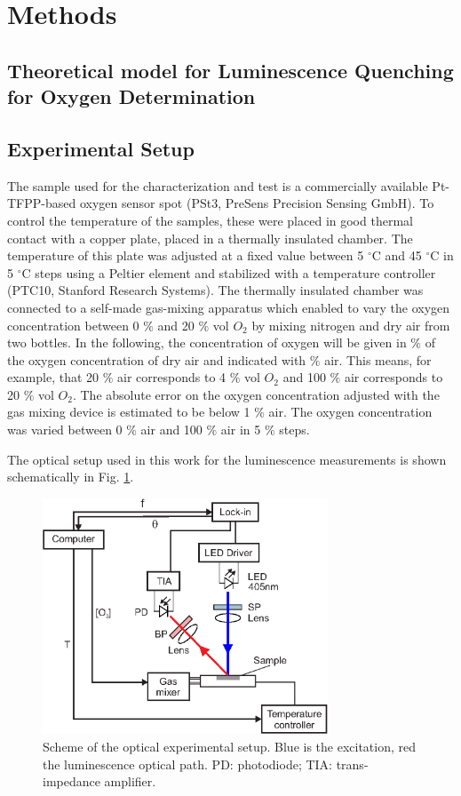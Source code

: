 \documentclass[9pt,twocolumn,twoside,pdftex]{optica}
\begin{document}
\section{Methods}
\label{sec:methods}

\subsection{Theoretical model for Luminescence Quenching for Oxygen Determination}
\label{Theory}




\subsection{Experimental Setup}
\label{Experimental}

The sample used for the characterization and test is a commercially available Pt-TFPP-based oxygen sensor spot (PSt3, PreSens Precision Sensing GmbH).
To control the temperature of the samples, these were placed in good thermal contact with a copper plate, placed in a thermally insulated chamber. The temperature of this plate was adjusted at a fixed value between 5 $^\circ$C and 45 $^\circ$C in 5 $^\circ$C steps using a Peltier element and stabilized with a temperature controller (PTC10, Stanford Research Systems). The thermally insulated chamber was connected to a self-made gas-mixing apparatus which enabled to vary the oxygen concentration between 0 $\%$ and 20 $\%$ vol $O_2$ by mixing nitrogen and dry air from two bottles. In the following, the concentration of oxygen will be given in $\%$ of the oxygen concentration of dry air and indicated with $\%$ air. This means, for example, that 20 $\%$ air corresponds to 4 $\%$ vol $O_2$ and 100 $\%$ air corresponds to 20 $\%$ vol $O_2$. The absolute error on the oxygen concentration adjusted with the gas mixing device is estimated to be below 1 $\%$ air. The oxygen concentration was varied between 0 $\%$ air and 100 $\%$ air in 5 $\%$ steps.
 
The optical setup used in this work for the luminescence measurements is shown schematically in Fig. \ref{fig:setup}.

\begin{figure}[htbp]
\centering
\includegraphics[keepaspectratio, width=8.5cm]{setup_auto.eps}
\caption{Scheme of the optical experimental setup. Blue is the excitation, red the luminescence optical path. PD: photodiode; TIA: trans-impedance amplifier.}
\label{fig:setup}
\end{figure}
\end{document}
